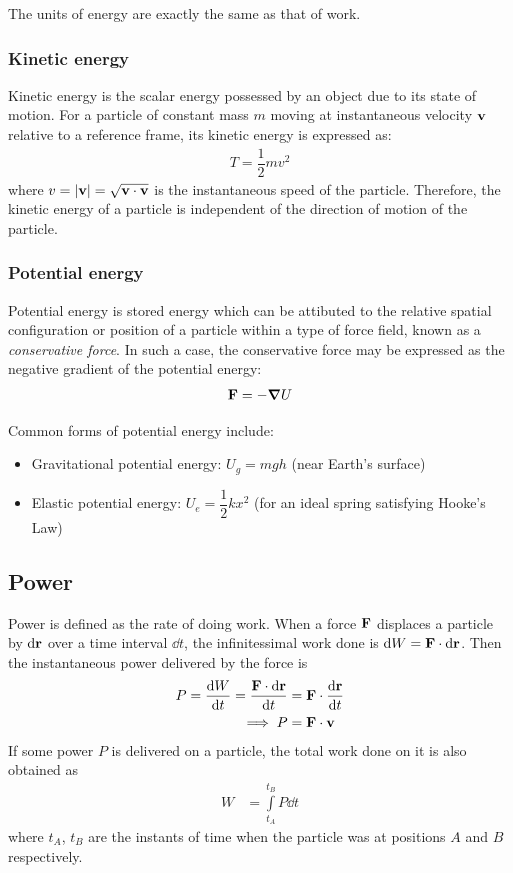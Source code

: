 		The units of energy are exactly the same as that of work.
		
		\subsubsection{Kinetic energy}
			Kinetic energy is the scalar energy possessed by an object due to its state of motion. For a particle of constant mass $m$ moving at instantaneous velocity $\vb{v}$ relative to a reference frame, its kinetic energy is expressed as:
			\begin{align*}
				T=\dfrac{1}{2}mv^2
			\end{align*}
			where $v=|\vb{v}|=\sqrt{\vb{v}\cdot\vb{v}}$ is the instantaneous speed of the particle. Therefore, the kinetic energy of a particle is independent of the direction of motion of the particle.
			
		\subsubsection{Potential energy}
			Potential energy is stored energy which can be attibuted to the relative spatial configuration or position of a particle within a type of force field, known as a \emph{conservative force}. In such a case, the conservative force may be expressed as the negative gradient of the potential energy:
			\begin{align*}
				\vb{F}=-\grad{U}
			\end{align*}
			
			Common forms of potential energy include:
			\begin{itemize}
				\item Gravitational potential energy: $U_g = mgh$ (near Earth's surface)
				
				\item Elastic potential energy: $U_e = \dfrac{1}{2}kx^2$ (for an ideal spring satisfying Hooke's Law)
			\end{itemize}
	
	\subsection{Power}
		Power is defined as the rate of doing work. When a force $\vb{F}$ displaces a particle by $\dd{\vb{r}}$ over a time interval $\dd{t}$, the infinitessimal work done is $\dd{W}=\vb{F}\cdot\dd{\vb{r}}$. Then the instantaneous power delivered by the force is
		\begin{align*}
			P=\dv{W}{t}=\dfrac{\vb{F}\cdot\dd{\vb{r}}}{\dd{t}}&=\vb{F}\cdot\dv{\vb{r}}{t} \\
			\implies P&=\vb{F}\cdot\vb{v}
		\end{align*}
		If some power $P$ is delivered on a particle, the total work done on it is also obtained as
		\begin{align*}
			W&=\int\limits_{t_A}^{t_B}{P\dd{t}}
		\end{align*}
		where $t_A$, $t_B$ are the instants of time when the particle was at positions $A$ and $B$ respectively.
		

